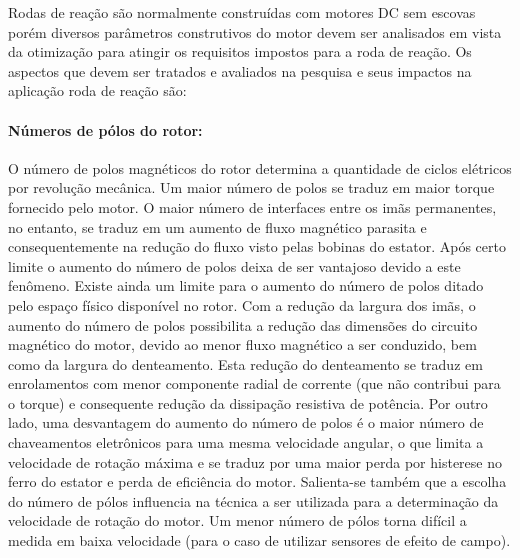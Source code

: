 Rodas de reação são normalmente construídas com motores DC sem escovas \cite{sinclair2007enabling} porém diversos parâmetros construtivos do motor devem ser analisados em vista da otimização para atingir os requisitos impostos para a roda de reação. Os aspectos que devem ser tratados e avaliados na pesquisa e seus impactos na aplicação roda de reação são:

%  			
%  			
%  		
%  			
%  			
%  			
%	


\paragraph{Números de pólos do rotor:}\label{sec:motor:pólos}

O número de polos magnéticos do rotor determina a quantidade de ciclos elétricos por revolução mecânica. Um maior número de polos se traduz em maior torque fornecido pelo motor. O maior número de interfaces entre os imãs permanentes, no entanto, se traduz em um aumento de fluxo magnético parasita e consequentemente na redução do fluxo visto pelas bobinas do estator. Após certo limite o aumento do número de polos deixa de ser vantajoso devido a este fenômeno. Existe ainda um limite para o aumento do número de polos ditado pelo espaço físico disponível no rotor.	Com a redução da largura dos imãs, o aumento do número de polos possibilita a redução das dimensões do circuito magnético do motor, devido ao menor fluxo magnético a ser conduzido, bem como da largura do denteamento. Esta redução do denteamento se traduz em enrolamentos com menor componente radial de corrente (que não contribui para o torque) e consequente redução da dissipação resistiva de potência.	Por outro lado, uma desvantagem do aumento do número de polos é o maior número de chaveamentos eletrônicos para uma mesma velocidade angular, o que limita a velocidade de rotação máxima e se traduz por uma maior perda por histerese no ferro do estator e perda de eficiência do motor. Salienta-se também que a escolha do número de pólos influencia na técnica a ser utilizada para a determinação da velocidade de rotação do motor. Um menor número de pólos torna difícil a medida em baixa velocidade (para o caso de utilizar sensores de efeito de campo).

